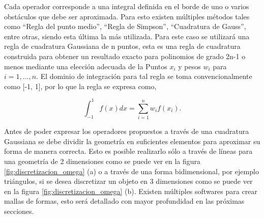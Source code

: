 \documentclass[12pt,letterpaper]{article}
\numberwithin{equation}{section}
\begin{document}
Cada operador corresponde a una integral definida en el borde de uno o varios obstáculos que debe ser aproximada. Para esto existen múltiples métodos tales como ``Regla del punto medio'', ``Regla de Simpson'', ``Cuadratura de Gauss'', entre otras, siendo esta última la más utilizada. Para este caso se utilizará una regla de cuadratura Gaussiana de n puntos, esta es una regla de cuadratura construida para obtener un resultado exacto para polinomios de grado 2n-1 o menos mediante una elección adecuada de la Puntos $x_i$ y pesos $w_i$ para $i = 1, \ldots, n$. El dominio de integración para tal regla se toma convencionalmente como [-1, 1], por lo que la regla se expresa como,

$$\int_{-1}^{1}f(x)dx = \sum_{i=1}^{n}w_if(x_i).$$

Antes de poder expresar los operadores propuestos a través de una cuadratura Gaussiana se debe dividir la geometría en suficientes elementos para aproximar su forma de manera correcta. Esto es posible realizarlo sólo a través de líneas para una geometría de 2 dimensiones como se puede ver en la figura \ref{fig:discretizacion_omega} (a) o a través de una forma bidimensional, por ejemplo triángulos, si se desea discretizar un objeto en 3 dimensiones como se puede ver en la figura \ref{fig:discretizacion_omega} (b). Existen múltiples softwares para crear mallas de formas, esto será detallado con mayor profundidad en las próximas secciones.
\end{document}
